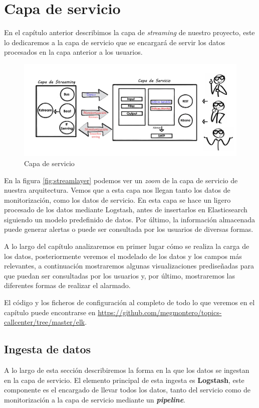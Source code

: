 \chapter{Capa de servicio}
\label{chapter:servicio}

En el capítulo anterior describimos la capa de \textit{streaming} de nuestro proyecto, este lo dedicaremos a la capa de servicio que se encargará de servir los datos procesados en la capa anterior a los usuarios.


\begin{figure}[!ht]
	\centering
	\includegraphics[width=1\textwidth]{images/serv/servicelayer_v1}
	\caption{Capa de servicio}
	\label{fig:servicelayer}
\end{figure}


En la figura \ref{fig:streamlayer} podemos ver un \textit{zoom} de la capa de servicio de nuestra arquitectura. Vemos que a esta capa nos llegan tanto los datos de monitorización, como los datos de servicio. En esta capa se hace un ligero procesado de los datos mediante Logstash, antes de insertarlos en Elasticsearch siguiendo un modelo predefinido de datos. Por último, la información almacenada puede generar alertas o puede ser consultada por los usuarios de diversas formas.

A lo largo del capítulo analizaremos en primer lugar cómo se realiza la carga de los datos, posteriormente veremos el modelado de los datos y los campos más relevantes, a continuación mostraremos algunas visualizaciones prediseñadas para que puedan ser consultadas por los usuarios y, por último, mostraremos las diferentes formas de realizar el alarmado.

El código y los ficheros de configuración al completo de todo lo que veremos en el capítulo puede encontrarse en \href{https://github.com/megmontero/topics-callcenter/tree/master/elk}{https://github.com/megmontero/topics-callcenter/tree/master/elk}.


\section{Ingesta de datos}
A lo largo de esta sección describiremos la forma en la que los datos se ingestan en la capa de servicio. El elemento principal de esta ingesta es \textbf{Logstash}, este componente es el encargado de llevar todos los datos, tanto del servicio como de monitorización a la capa de servicio mediante un \textit{\textbf{pipeline}}. 

